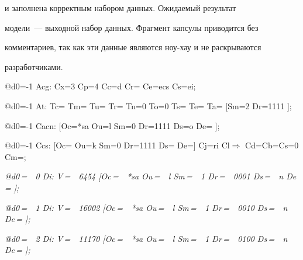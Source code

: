 и заполнена корректным набором данных. Ожидаемый результат 


модели~--- выходной набор данных.  Фрагмент капсулы приводится без 


комментариев, так как эти данные являются ноу-хау и не раскрываются 


разработчиками.\\





{\small


\noindent


{\sf @d0=-1 Acg: Cx=3 Cp=4 Cc=d Cr= Ce=ecs Cs=ei;}\\[-7pt]





\noindent


{\sf @d0=-1 At: Tc= Tm= Tu= Tr= Tn=0 To=0 Ts= Te= Ta= [Sm=2 Dr=1111 ]; }\\[-7pt]





\noindent


{\sf @d0=-1 Cacn: [Oc=*sa Ou=l Sm=0 Dr=1111 Ds=o De= ];}\\[-7pt]





\noindent


{\sf @d0=-1 Ccs: [Oc= Ou=k Sm=0 Dr=1111 Ds= De=] Cj=ri Cl$\Rightarrow$ Cd=Cb=Cs=0 Cm=;}\\[-7pt]





\noindent


\textit{@d0\,=\ \ 0 Di: V\,=\ \ 6454 [Oc\,=\ \ *sa Ou\,=\ \ l Sm\,=\ \ 1 Dr\,=\ \ 0001 Ds\,=\ \ n De\,= ];}\\[-7pt]





\noindent


\textit{@d0\,=\ \ 1 Di: V\,=\ \ 16002 [Oc\,=\ \ *sa Ou\,=\ \ l Sm\,=\ \ 1 Dr\,=\ \ 0010 Ds\,=\ \ n De\,= ];}\\[-7pt]





\noindent


\textit{@d0\,=\ \ 2 Di: V\,=\ \ 11170 [Oc\,=\ \ *sa Ou\,=\ \ l Sm\,=\ \ 1 Dr\,=\ \ 0100 Ds\,=\ \ n De\,= ];}\\[-7pt]





}
